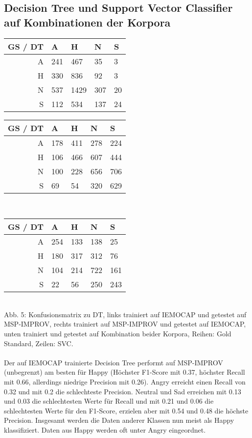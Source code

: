 \documentclass{article} %
\begin{document}
\subsection{Decision Tree und Support Vector Classifier auf Kombinationen der Korpora}
\begin{tabular}{|r|llll|}
\hline
GS / DT & A & H & N & S \\
\hline
A & 241 & 467 & 35 & 3 \\
H & 330 & 836 & 92 & 3 \\
N & 537 & 1429 & 307 & 20 \\
S & 112 & 534 & 137 & 24 \\
\hline
\end{tabular}
\begin{tabular}{|r|llll|}
\hline
GS / DT & A & H & N & S \\
\hline
A & 178 & 411 & 278 & 224 \\
H & 106 & 466 & 607 & 444 \\
N & 100 & 228 & 656 & 706 \\
S & 69 & 54 & 320 & 629 \\
\hline
\end{tabular} \\
\begin{tabular}{|r|llll|}
\hline
GS / DT & A & H & N & S \\
\hline
A & 254 & 133 & 138 & 25 \\
H & 180 & 317 & 312 & 76 \\
N & 104 & 214 & 722 & 161 \\
S & 22 & 56 & 250 & 243 \\
\hline
\end{tabular} \\
Abb. 5: Konfusionsmatrix zu DT, links trainiert auf IEMOCAP und getestet auf MSP-IMPROV, rechts trainiert auf MSP-IMPROV und getestet auf IEMOCAP, unten trainiert und getestet auf Kombination beider Korpora, Reihen: Gold Standard, Zeilen: SVC. \\ \\
Der auf IEMOCAP trainierte Decision Tree performt auf MSP-IMPROV (unbegrenzt) am besten für Happy (Höchster F1-Score mit 0.37, höchster Recall mit 0.66, allerdings niedrige Precision mit 0.26). Angry erreicht einen Recall von 0.32 und mit 0.2 die schlechteste Precision. Neutral und Sad erreichen mit 0.13 und 0.03 die schlechtesten Werte für Recall und mit 0.21 und 0.06 die schlechtesten Werte für den F1-Score, erzielen aber mit 0.54 und 0.48 die höchste Precision. 
Insgesamt werden die Daten anderer Klassen nun meist als Happy klassifiziert. Daten aus Happy werden oft unter Angry eingeordnet. 
\end{document}
